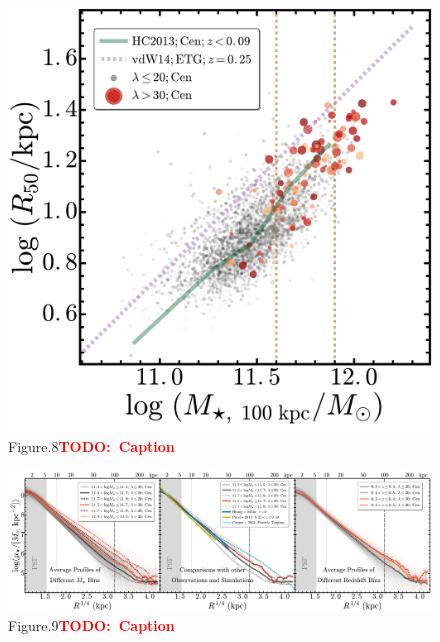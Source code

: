 \documentclass[preprint]{aastex}
\newcommand{\todo}[1]{\textcolor{red}{\textbf{TODO:~#1}}}
\begin{document}
\begin{CJK*}{UTF8}{gbsn}
\clearpage
{}
\begin{figure}
    \centering 
    \includegraphics[width=14.0cm]{fig/redbcg_mass_r50}
    \caption{Figure.8\todo{Caption}}\label{figure:8}
\end{figure}

\clearpage
{}
\begin{figure}
    \centering 
    \includegraphics[width=18.5cm]{fig/redbcg_avg_prof}
    \caption{Figure.9\todo{Caption}}\label{figure:9}
\end{figure}


\end{CJK*}
\end{document}
